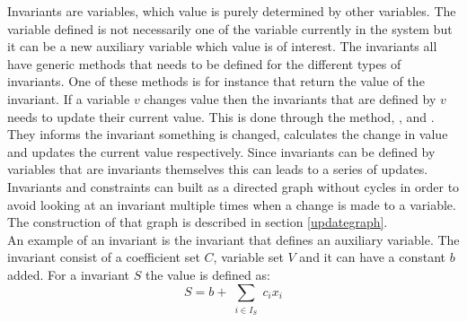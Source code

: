 Invariants are variables, which value is purely determined by other variables. The variable defined is not necessarily 
one of the variable currently in the system but it can be a new auxiliary variable which value is of interest.  
The invariants all have generic methods that needs to be defined for the different types of invariants. One of these 
methods is for instance  that return the value of the invariant. If a variable $v$ 
changes value then the invariants that are defined by $v$ needs to update their current value. This is done 
through the  method, , and  . They 
informs the invariant something is changed, calculates the change in value and updates the current value respectively. 
Since invariants can be defined by variables that are invariants themselves this can leads to a series of 
updates. Invariants and constraints can built as a directed graph without cycles in 
order to avoid looking at an invariant multiple times when a change is made to a variable. The construction of that 
graph is described in section \ref{updategraph}. \\ 
An example of an invariant is the  invariant that defines an auxiliary variable. The 
 invariant consist of a coefficient set $C$, variable set $V$ and it can have a constant $b$ added. For 
a  invariant $S$ the value is defined as: \\
\begin{equation}
 S = b+ \sum_{\substack{i \in I_S}}  c_i x_i  
\end{equation}



